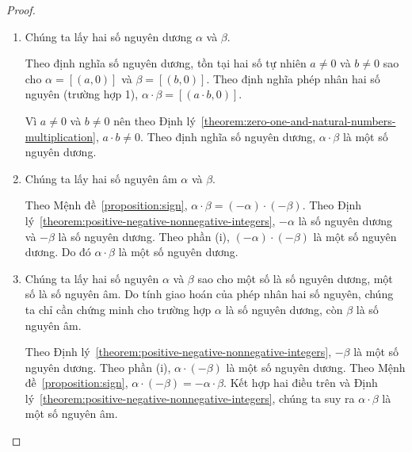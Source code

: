 \begin{proof}
	\begin{enumerate}[label={(\roman*)}]
		\item Chúng ta lấy hai số nguyên dương $\alpha$ và $\beta$.

		      Theo định nghĩa số nguyên dương, tồn tại hai số tự nhiên $a\ne 0$ và $b\ne 0$ sao cho $\alpha = [(a,0)]$ và $\beta = [(b,0)]$. Theo định nghĩa phép nhân hai số nguyên (trường hợp 1), $\alpha\cdot\beta = [(a\cdot b, 0)]$.

		      Vì $a\ne 0$ và $b\ne 0$ nên theo Định lý~\ref{theorem:zero-one-and-natural-numbers-multiplication}, $a\cdot b\ne 0$. Theo định nghĩa số nguyên dương, $\alpha\cdot\beta$ là một số nguyên dương.
		\item Chúng ta lấy hai số nguyên âm $\alpha$ và $\beta$.

		      Theo Mệnh đề~\ref{proposition:sign}, $\alpha\cdot\beta = (-\alpha)\cdot(-\beta)$. Theo Định lý~\ref{theorem:positive-negative-nonnegative-integers}, $-\alpha$ là số nguyên dương và $-\beta$ là số nguyên dương. Theo phần (i), $(-\alpha)\cdot(-\beta)$ là một số nguyên dương. Do đó $\alpha\cdot\beta$ là một số nguyên dương.
		\item Chúng ta lấy hai số nguyên $\alpha$ và $\beta$ sao cho một số là số nguyên dương, một số là số nguyên âm. Do tính giao hoán của phép nhân hai số nguyên, chúng ta chỉ cần chứng minh cho trường hợp $\alpha$ là số nguyên dương, còn $\beta$ là số nguyên âm.

		      Theo Định lý~\ref{theorem:positive-negative-nonnegative-integers}, $-\beta$ là một số nguyên dương. Theo phần (i), $\alpha\cdot(-\beta)$ là một số nguyên dương. Theo Mệnh đề~\ref{proposition:sign}, $\alpha\cdot(-\beta) = -\alpha\cdot\beta$. Kết hợp hai điều trên và Định lý~\ref{theorem:positive-negative-nonnegative-integers}, chúng ta suy ra $\alpha\cdot\beta$ là một số nguyên âm.
	\end{enumerate}
\end{proof}

